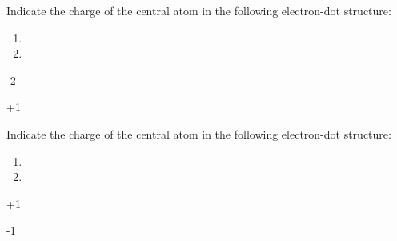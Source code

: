 \documentclass[main.tex]{subfiles}
\begin{document}
\begin{multicols*}{2}
\begin{question}[ID=\the\value{numA}]
\end{question}
\begin{solution}
\hspace{.05in}
\end{solution}
\begin{question}[ID=\the\value{numA}]
Indicate the charge of the central atom in the following electron-dot structure:
\vspace{0.3cm}\begin{multicols*}{2}
\begin{enumerate}[label=(\alph*)]
\item {} 
\item {}
\end{enumerate}\end{multicols*}
\end{question}
\begin{solution} 
 \begin{inparaenum}[(a)]
\item -2
\item +1
 \end{inparaenum}\hspace{0.1cm}\end{solution}
\begin{question}[ID=\the\value{numA}]
Indicate the charge of the central atom in the following electron-dot structure:
\vspace{0.3cm}\begin{multicols*}{2}
\begin{enumerate}[label=(\alph*)]
\item {}
\item {}
\end{enumerate}
\end{multicols*}
\end{question}
\begin{solution} 
 \begin{inparaenum}[(a)]
\item +1
\item -1
 \end{inparaenum}\hspace{0.1cm}\end{solution}


\end{multicols*}
\end{document}
